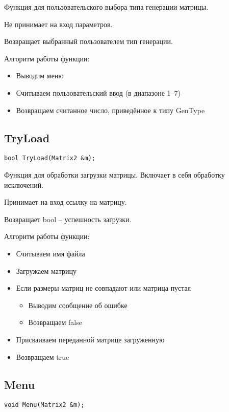 \documentclass[12pt,a4paper]{article}  %
\begin{document}
	Функция для пользовательского выбора типа генерации матрицы.

	Не принимает на вход параметров.

	Возвращает выбранный пользователем тип генерации.

	Алгоритм работы функции:

	\begin{itemize}
		\item Выводим меню
		\item Считываем пользовательский ввод (в диапазоне 1--7)
		\item Возвращаем считанное число, приведённое к типу GenType
	\end{itemize}

	\subsection*{TryLoad}

	\begin{lstlisting}[label={lst:TryLoad}]
		bool TryLoad(Matrix2 &m);
	\end{lstlisting}

	Функция для обработки загрузки матрицы.
	Включает в себя обработку исключений.

	Принимает на вход ссылку на матрицу.

	Возвращает bool -- успешность загрузки.

	Алгоритм работы функции:

	\begin{itemize}
		\item Считываем имя файла
		\item Загружаем матрицу
		\item Если размеры матриц не совпадают или матрица пустая
		\begin{itemize}
			\item Выводим сообщение об ошибке
			\item Возвращаем false
		\end{itemize}
		\item Присваиваем переданной матрице загруженную
		\item Возвращаем true
	\end{itemize}

	\subsection*{Menu}

	\begin{lstlisting}[label={lst:Menu}]
		void Menu(Matrix2 &m);
	\end{lstlisting}
\end{document}
